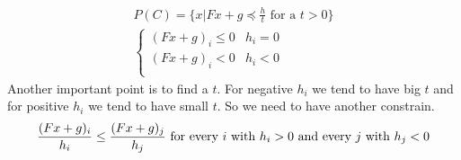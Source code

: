 \documentclass[a4paper]{article}
\begin{document}
\begin{latin}
\begin{enumerate}
	\begin{gather*}
		P(C) = \{ x | Fx + g \preceq \frac{h}{t} \text{ for a } t>0 \}
		\\
		\begin{cases}
			(Fx + g)_{i} \leq 0 & h_{i}=0 \\
			(Fx + g)_{i}< 0 & h_{i}<0 \\
		\end{cases}
	\end{gather*}
	Another important point is to find a $ t $. For negative $ h_{i} $ we tend to have big $ t $ and for positive  $ h_{i} $ we tend to have small $ t $. So we need to have another constrain. 
	\begin{gather*}
		\dfrac{(Fx + g)_{i}}{h_{i}} \leq \dfrac{(Fx + g)_{j}}{h_{j}} \text{ for every $ i $ with } h_{i}>0 \text{ and every $ j $ with } h_{j}<0
	\end{gather*}
\end{enumerate}

\end{latin}
\end{document}
